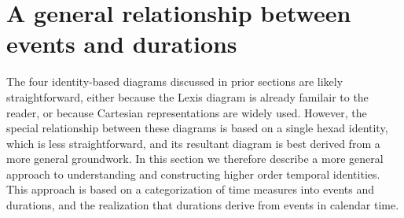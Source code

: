 \documentclass[12pt,oneside,a4paper]{article} %
\theoremstyle{definition}
\begin{document}

\FloatBarrier

\section{A general relationship between events and durations}
\label{sec:gen}
The four identity-based diagrams discussed in prior sections are likely
straightforward, either because the Lexis diagram is already
familair to the reader, or because Cartesian representations are widely used.
However, the special relationship between these diagrams is based on a single
hexad identity, which is less straightforward, and its resultant
diagram is best derived from a more general groundwork. In this section we therefore describe a more general
approach to understanding and constructing higher order temporal identities.
This approach is based on a categorization of time measures into events and
durations, and the realization that durations derive from events in calendar
time.
\end{document}
